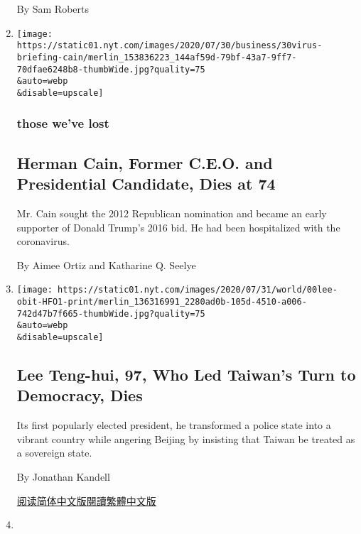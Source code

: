 \begin{enumerate}
  By Sam Roberts
\item
  \href{/2020/07/30/us/politics/herman-cain-dead.html}{}

  \texttt{[image: https://static01.nyt.com/images/2020/07/30/business/30virus-briefing-cain/merlin\_153836223\_144af59d-79bf-43a7-9ff7-70dfae6248b8-thumbWide.jpg?quality=75\\\&auto=webp\\\&disable=upscale]}

  \hypertarget{those-weve-lost-3}{%
  \subsubsection{those we've lost}\label{those-weve-lost-3}}

  \hypertarget{herman-cain-former-ceo-and-presidential-candidate-dies-at-74}{%
  \subsection{Herman Cain, Former C.E.O. and Presidential Candidate,
  Dies at
  74}\label{herman-cain-former-ceo-and-presidential-candidate-dies-at-74}}

  Mr. Cain sought the 2012 Republican nomination and became an early
  supporter of Donald Trump's 2016 bid. He had been hospitalized with
  the coronavirus.

  By Aimee Ortiz and Katharine Q. Seelye
\item
  \href{/2020/07/30/world/asia/lee-teng-hui-dead.html}{}

  \texttt{[image: https://static01.nyt.com/images/2020/07/31/world/00lee-obit-HFO1-print/merlin\_136316991\_2280ad0b-105d-4510-a006-742d47b7f665-thumbWide.jpg?quality=75\\\&auto=webp\\\&disable=upscale]}

  \hypertarget{lee-teng-hui-97-who-led-taiwans-turn-to-democracy-dies}{%
  \subsection{Lee Teng-hui, 97, Who Led Taiwan's Turn to Democracy,
  Dies}\label{lee-teng-hui-97-who-led-taiwans-turn-to-democracy-dies}}

  Its first popularly elected president, he transformed a police state
  into a vibrant country while angering Beijing by insisting that Taiwan
  be treated as a sovereign state.

  By Jonathan Kandell

  \href{https://cn.nytimes.com/asia-pacific/20200730/lee-teng-hui-dead/}{阅读简体中文版}\href{https://cn.nytimes.com/asia-pacific/20200730/lee-teng-hui-dead/zh-hant/}{閱讀繁體中文版}
\item
  \href{/2020/07/29/sports/ncaabasketball/lou-henson-dead.html}{}


\end{enumerate}
